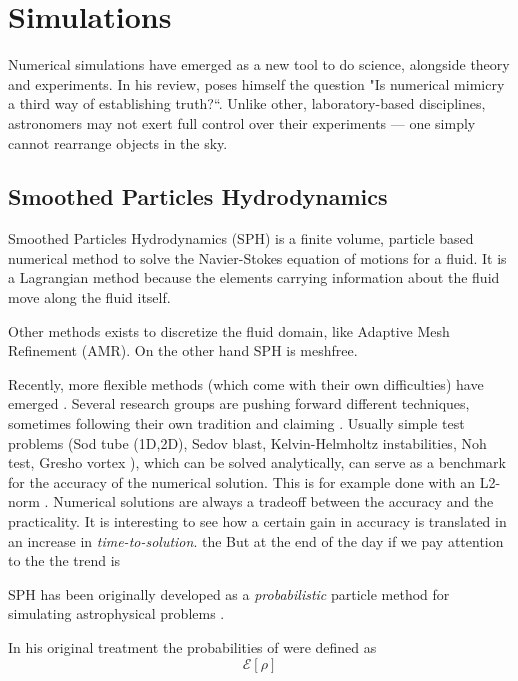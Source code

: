 \chapter{Simulations}
\label{ch:simulations}

Numerical simulations have emerged as a new tool to do science, alongside theory and experiments.
In his review, \cite{Heng2014} poses himself the question "Is numerical mimicry a third way of establishing truth?``. Unlike other, laboratory-based disciplines, astronomers may not exert full control over their experiments — one simply cannot rearrange objects in the sky.




\section{Smoothed Particles Hydrodynamics}
Smoothed Particles Hydrodynamics (SPH) is a finite volume, particle based numerical method to solve the Navier-Stokes equation of motions for a fluid.
It is a Lagrangian method because the elements carrying information about the fluid move along the fluid itself.

Other methods exists to discretize the fluid domain, like Adaptive Mesh Refinement (AMR).
On the other hand SPH is meshfree.

Recently, more flexible methods (which come with their own difficulties) have emerged \citep{Springel2010, Shadowfax, Arepo}.
Several research groups are pushing forward different techniques, sometimes following their own tradition and claiming . 
Usually simple test problems (Sod tube (1D,2D), Sedov blast, Kelvin-Helmholtz instabilities, Noh test, Gresho vortex \citet{Gresho1990}), %
which can be solved analytically, can serve as a benchmark for the accuracy of the numerical solution. This is for example done with an L2-norm \citep{Borrow}.
Numerical solutions are always a tradeoff between the accuracy and the practicality.
It is interesting to see how a certain gain in accuracy is translated in an increase in \emph{time-to-solution}. the But at the end of the day if we pay attention to the the trend is 

SPH has been originally developed as a \emph{probabilistic} particle method for simulating astrophysical problems \citep{Lucy1977, Gingold1977}.

In his original treatment \citet{Gingold1977} the probabilities of were defined as 
\begin{equation}
 \mathcal{E}[\rho] %
\end{equation}





